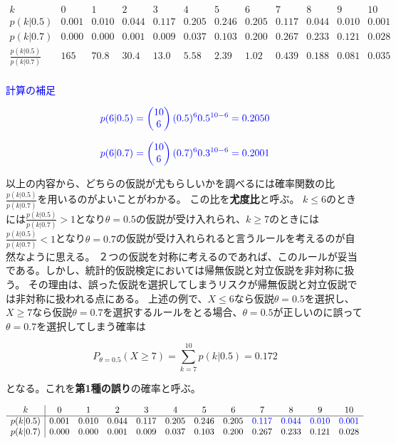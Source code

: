 \documentclass{article}
\begin{document}
\begin{table}[h]
  \centering
  \[
  \begin{array}{c|ccccccccccc}
  k & 0 & 1 & 2 & 3 & 4 & 5 & 6 & 7 & 8 & 9 & 10 \\ \hline
  p(k|0.5) & 0.001 & 0.010 & 0.044 & 0.117 & 0.205 & 0.246 & 0.205 & 0.117 & 0.044 & 0.010 & 0.001 \\
  p(k|0.7) & 0.000 & 0.000 & 0.001 & 0.009 & 0.037 & 0.103 & 0.200 & 0.267 & 0.233 & 0.121 & 0.028 \\ \hline
  \frac{p(k|0.5)}{p(k|0.7)} & 165 & 70.8 & 30.4 & 13.0 & 5.58 & 2.39 & 1.02 & 0.439 & 0.188 & 0.081 & 0.035 \\ 
  \end{array}
  \]
  \label{tab:probability_table}
\end{table}

\textcolor{blue}{計算の補足}

$$
\textcolor{blue}{p(6|0.5)=\begin{pmatrix}
  10 \\
  6
\end{pmatrix}(0.5)^6 0.5^{10-6} = 0.2050}
$$



$$
\textcolor{blue}{p(6|0.7)=\begin{pmatrix}
  10 \\
  6
\end{pmatrix}(0.7)^6 0.3^{10-6} = 0.2001}
$$



以上の内容から、どちらの仮説が尤もらしいかを調べるには確率関数の比$\frac{p(k|0.5)}{p(k|0.7)}$を用いるのがよいことがわかる。
この比を\textbf{尤度比}と呼ぶ。
$k \leq 6$のときには$\frac{p(k|0.5)}{p(k|0.7)} >1$となり$\theta=0.5$の仮説が受け入れられ、$k \geq 7$のときには$\frac{p(k|0.5)}{p(k|0.7)}<1$となり$\theta = 0.7$の仮説が受け入れられると言うルールを考えるのが自然なように思える。
２つの仮説を対称に考えるのであれば、このルールが妥当である。しかし、統計的仮説検定においては帰無仮説と対立仮説を非対称に扱う。
その理由は、誤った仮説を選択してしまうリスクが帰無仮説と対立仮説では非対称に扱われる点にある。
上述の例で、$X \leq 6$なら仮説$\theta=0.5$を選択し、$X \geq 7$なら仮説$\theta=0.7$を選択するルールをとる場合、$\theta=0.5$が正しいのに誤って$\theta=0.7$を選択してしまう確率は

$$
P_{\theta = 0.5}(X \geq 7) = \sum_{k=7}^{10} p(k|0.5)=0.172
$$

となる。これを\textbf{第1種の誤り}の確率と呼ぶ。

\begin{table}[h]
  \centering
  \[
  \begin{array}{c|ccccccccccc}
  k & 0 & 1 & 2 & 3 & 4 & 5 & 6 & 7 & 8 & 9 & 10 \\ \hline
  p(k|0.5) & 0.001 & 0.010 & 0.044 & 0.117 & 0.205 & 0.246 & 0.205 & \textcolor{blue}{0.117} & \textcolor{blue}{0.044} & \textcolor{blue}{0.010} & \textcolor{blue}{0.001} \\
  p(k|0.7) & 0.000 & 0.000 & 0.001 & 0.009 & 0.037 & 0.103 & 0.200 & 0.267 & 0.233 & 0.121 & 0.028 \\
  \end{array}
  \]
\end{table}
\end{document}
